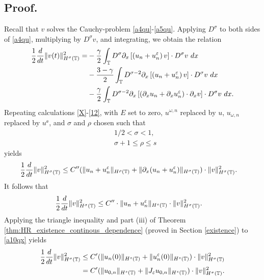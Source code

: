 \subsection{ Proof.}
Recall that $v$ solves the Cauchy-problem \eqref{a4qu}-\eqref{a5qu}.
Applying $D^\sigma$ to both sides of \eqref{a4qu}, multiplying by
$D^\sigma v$, and integrating, we obtain the
relation
\begin{equation*}
	\begin{split}
		\frac{1}{2}\frac{d}{dt}\|v(t)\|_{H^\sigma(\mathbb{T})}^2
		= & - \frac{\gamma}{2}\int_{\mathbb{T}} D^\sigma
		\partial_x \left[ \left( u_n + u^\varepsilon_n \right)v
		\right]\cdot D^\sigma v \ dx
		\\
		& - \frac{3-\gamma}{2}\int_{\mathbb{T}} D^{\sigma
		-2} \partial_x \left[ \left( u_n + u^\varepsilon_n
		\right)v \right] \cdot D^\sigma v \ dx
		\\
		& - \frac{\gamma}{2}\int_{\mathbb{T}} D^{\sigma
		-2}
		\partial_x \left[ \left( \partial_x u_n + \partial_x u^\varepsilon_n
		\right)\cdot \partial_x v \right] \cdot
		D^\sigma v \ dx.
	\end{split}
\end{equation*}
Repeating calculations \eqref{X}-\eqref{12}, with $E$ set to zero,
$u^{\omega,n}$ replaced by $u$, $u_{\omega,n}$ replaced by $u^\ee$, and
$\sigma$ and $\rho$ chosen such that
%
\begin{equation}
	\begin{split}
	& 1/2 < \sigma < 1,
	\\
	& \sigma + 1 \le \rho \le s 
	\end{split}
\end{equation}
yields
 \begin{equation*}
	\begin{split}
		\frac{1}{2}\frac{d}{dt} \|v\|_{H^\sigma(\mathbb{T})}^2
		& \le
		C'' (\|u_n + u^\varepsilon_n \|_{H^{\rho}(\mathbb{T})} +
		\|\partial_x(u_n + u^\varepsilon_n) \|_{H^\sigma(\mathbb{T})})
		\cdot \|v\|_{H^\sigma(\mathbb{T})}^2.
	\end{split}
\end{equation*}
\medskip
It follows that 
\begin{equation}
	\begin{split}
		\frac{1}{2}\frac{d}{dt} \|v\|_{H^{\sigma}(\mathbb{T})}^2
		& \le
		C'' \cdot \|u_n
		+ u^\varepsilon_n\|_{H^{s}(\mathbb{T})}\cdot \|v\|_{H^{\sigma}(\mathbb{T})}^2.
		\label{a10qx}
	\end{split}
\end{equation}
Applying the triangle inequality and
part (iii) of Theorem \ref{thm:HR_existence_continous_dependence} (proved in
Section \ref{existence})
to \eqref{a10qx} yields
%
\begin{equation}
	\begin{split}
		\label{a11qx}
		\frac{1}{2}\frac{d}{dt} \|v\|_{H^{\sigma}(\mathbb{T})}^2
		& \le
		C' (\|u_n(0)\|_{H^{s}(\mathbb{T})}
		+ \|u^\varepsilon_n(0)\|_{H^{s}(\mathbb{T})})\cdot \|v\|_{H^{\sigma}(\mathbb{T})}^2
		\\
		& = C' (\|u_{0,n}\|_{H^{s}(\mathbb{T})}
		+ \|J_\varepsilon u_{0,n}\|_{H^{s}(\mathbb{T})})\cdot \|v\|_{H^{\sigma}(\mathbb{T})}^2.
	\end{split}
\end{equation}
